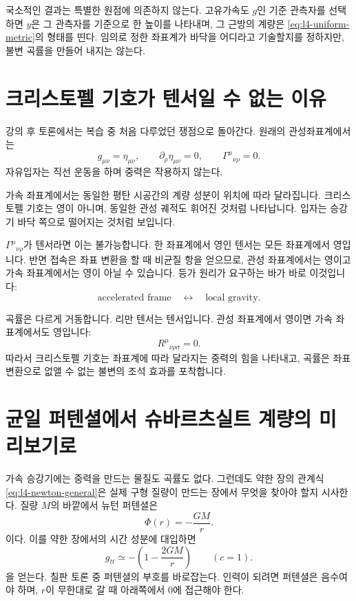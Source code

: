 국소적인 결과는 특별한 원점에 의존하지 않는다. 고유가속도 \(g\)인 기준 관측자를 선택하면 \(y\)은 그 관측자를 기준으로 한 높이를 나타내며, 그 근방의 계량은 \eqref{eq:l4-uniform-metric}의 형태를 띤다. 임의로 정한 좌표계가 바닥을 어디라고 기술할지를 정하지만, 불변 곡률을 만들어 내지는 않는다.

\section{크리스토펠 기호가 텐서일 수 없는 이유}

강의 후 토론에서는 복습 중 처음 다루었던 쟁점으로 돌아간다. 원래의 관성좌표계에서는
\begin{equation}
g_{\mu\nu}=\eta_{\mu\nu},
\qquad
\partial_\rho\eta_{\mu\nu}=0,
\qquad
\Gamma^\mu{}_{\nu\rho}=0.
\end{equation}
자유입자는 직선 운동을 하며 중력은 작용하지 않는다.

가속 좌표계에서는 동일한 평탄 시공간의 계량 성분이 위치에 따라 달라집니다. 크리스토펠 기호는 영이 아니며, 동일한 관성 궤적도 휘어진 것처럼 나타납니다. 입자는 승강기 바닥 쪽으로 떨어지는 것처럼 보입니다.

\(\Gamma^\mu{}_{\nu\rho}\)가 텐서라면 이는 불가능합니다. 한 좌표계에서 영인 텐서는 모든 좌표계에서 영입니다. 반면 접속은 좌표 변환을 할 때 비균질 항을 얻으므로, 관성 좌표계에서는 영이고 가속 좌표계에서는 영이 아닐 수 있습니다. 등가 원리가 요구하는 바가 바로 이것입니다:
\begin{equation}
\text{accelerated frame}
\quad\longleftrightarrow\quad
\text{local gravity}.
\end{equation}

곡률은 다르게 거동합니다. 리만 텐서는 텐서입니다. 관성 좌표계에서 영이면 가속 좌표계에서도 영입니다:
\begin{equation}
R^\mu{}_{\nu\rho\sigma}=0.
\end{equation}
따라서 크리스토펠 기호는 좌표계에 따라 달라지는 중력의 힘을 나타내고, 곡률은 좌표 변환으로 없앨 수 없는 불변의 조석 효과를 포착합니다.

\section{균일 퍼텐셜에서 슈바르츠실트 계량의 미리보기로}

가속 승강기에는 중력을 만드는 물질도 곡률도 없다. 그런데도 약한 장의 관계식 \eqref{eq:l4-newton-general}은 실제 구형 질량이 만드는 장에서 무엇을 찾아야 할지 시사한다. 질량 \(M\)의 바깥에서 뉴턴 퍼텐셜은
\begin{equation}
\Phi(r)=-\frac{GM}{r}.
\label{eq:l4-newton-potential}
\end{equation}
이다. 이를 약한 장에서의 시간 성분에 대입하면
\begin{equation}
g_{tt}
\simeq
-\left(1-\frac{2GM}{r}\right)
\qquad(c=1).
\label{eq:l4-schwarzschild-preview}
\end{equation}
을 얻는다. 칠판 토론 중 퍼텐셜의 부호를 바로잡는다. 인력이 되려면 퍼텐셜은 음수여야 하며, \(r\)이 무한대로 갈 때 아래쪽에서 0에 접근해야 한다.

